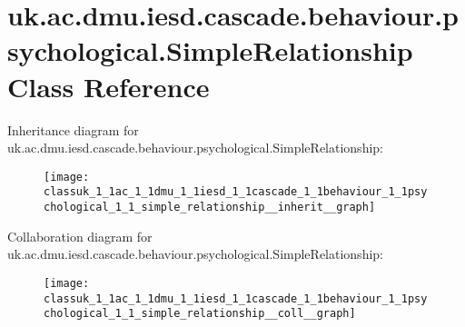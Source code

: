 \hypertarget{classuk_1_1ac_1_1dmu_1_1iesd_1_1cascade_1_1behaviour_1_1psychological_1_1_simple_relationship}{\section{uk.\-ac.\-dmu.\-iesd.\-cascade.\-behaviour.\-psychological.\-Simple\-Relationship Class Reference}
\label{classuk_1_1ac_1_1dmu_1_1iesd_1_1cascade_1_1behaviour_1_1psychological_1_1_simple_relationship}
}


Inheritance diagram for uk.\-ac.\-dmu.\-iesd.\-cascade.\-behaviour.\-psychological.\-Simple\-Relationship\-:\nopagebreak
\begin{figure}[H]
\begin{center}
\leavevmode
\texttt{[image: classuk\_1\_1ac\_1\_1dmu\_1\_1iesd\_1\_1cascade\_1\_1behaviour\_1\_1psychological\_1\_1\_simple\_relationship\_\_inherit\_\_graph]}
\end{center}
\end{figure}


Collaboration diagram for uk.\-ac.\-dmu.\-iesd.\-cascade.\-behaviour.\-psychological.\-Simple\-Relationship\-:\nopagebreak
\begin{figure}[H]
\begin{center}
\leavevmode
\texttt{[image: classuk\_1\_1ac\_1\_1dmu\_1\_1iesd\_1\_1cascade\_1\_1behaviour\_1\_1psychological\_1\_1\_simple\_relationship\_\_coll\_\_graph]}
\end{center}
\end{figure}
